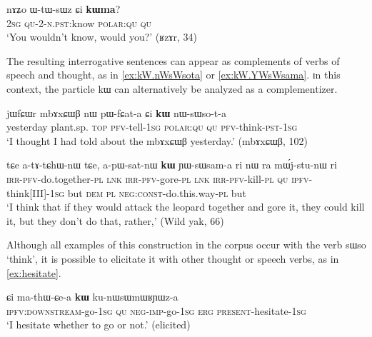 \documentclass[oldfontcommands,oneside,a4paper,11pt]{article}
\newcommand{\ipa}[1]{{\phon #1}} %
\begin{document}
        \begin{exe} 
 \ex \label{ex:kWma3}
\gll 
 \ipa{nɤʑo} 	\ipa{ɯ-tɯ-sɯz} 	\ipa{ɕi} 	\ipa{\textbf{kɯma}?}  \\
 \textsc{2sg} \textsc{qu-2-n.pst}:know \textsc{polar:qu} \textsc{qu} \\
\glt `You wouldn't know, would you?' (ʁzɤr, 34)
    \end{exe}
    
    
    The resulting interrogative sentences can appear as complements of verbs of speech and thought, as in \ref{ex:kW.nWsWsota} or \ref{ex:kW.YWsWsama}. ɪn this context, the particle \ipa{kɯ} can alternatively be analyzed as a complementizer.
    
    \begin{exe} 
 \ex \label{ex:kW.nWsWsota}
\gll 
    \ipa{jɯfɕɯr} 	\ipa{mbɤxɕɯβ} 	\ipa{nɯ} 	\ipa{pɯ-fɕat-a} 	\ipa{ɕi} 	\ipa{\textbf{kɯ}} 	\ipa{nɯ-sɯso-t-a} \\
    yesterday plant.sp. \textsc{top} \textsc{pfv}-tell-\textsc{1sg} \textsc{polar:qu} \textsc{qu} \textsc{pfv}-think-\textsc{pst-1sg} \\
    \glt `I thought I had told about the   \ipa{mbɤxɕɯβ} yesterday.' (mbɤxɕɯβ, 102)
 \end{exe}  
 

    \begin{exe} 
 \ex \label{ex:kW.YWsWsama}
\gll \ipa{a-kɤ-nɯtshɤβ-nɯ} 	\ipa{tɕe} 	\ipa{a-tɤ-tɕhɯ-nɯ} 	\ipa{tɕe,} 	\ipa{a-pɯ-sat-nɯ} 	\ipa{\textbf{kɯ}} 	\ipa{ɲɯ-sɯsam-a} 	\ipa{ri}  \ipa{nɯ} \ipa{ra} 	\ipa{mɯ́j-stu-nɯ} 	\ipa{ri} \\
\textsc{irr-pfv}-do.together-\textsc{pl} \textsc{lnk} \textsc{irr-pfv}-gore-\textsc{pl} \textsc{lnk } \textsc{irr-pfv}-kill-\textsc{pl} \textsc{qu} \textsc{ipfv}-think[III]-\textsc{1sg} but \textsc{dem} \textsc{pl} \textsc{neg:const}-do.this.way-\textsc{pl}  but \\
\glt `I think that if they would attack the leopard together and gore it, they could kill it, but they don't do that, rather,' (Wild yak, 66)
 \end{exe} 
 
 
Although all examples of this construction in the corpus occur with the verb \ipa{sɯso} `think', it is possible to elicitate it with other thought or speech verbs, as in \ref{ex:hesitate}.


 \begin{exe} 
 \ex \label{ex:hesitate}
\gll \ipa{chɯ-ɕe-a}   	\ipa{ɕi}   	\ipa{ma-thɯ-ɕe-a}   	\ipa{\textbf{kɯ}}   	\ipa{ku-nɯsɯmɯʁɲɯz-a}          \\
\textsc{ipfv:downstream}-go-\textsc{1sg} \textsc{qu} \textsc{neg}-\textsc{imp}-go-\textsc{1sg} \textsc{erg} \textsc{present}-hesitate-\textsc{1sg}   \\
 \glt  `I hesitate whether to go or not.' (elicited)
\end{exe}  
\end{document}

